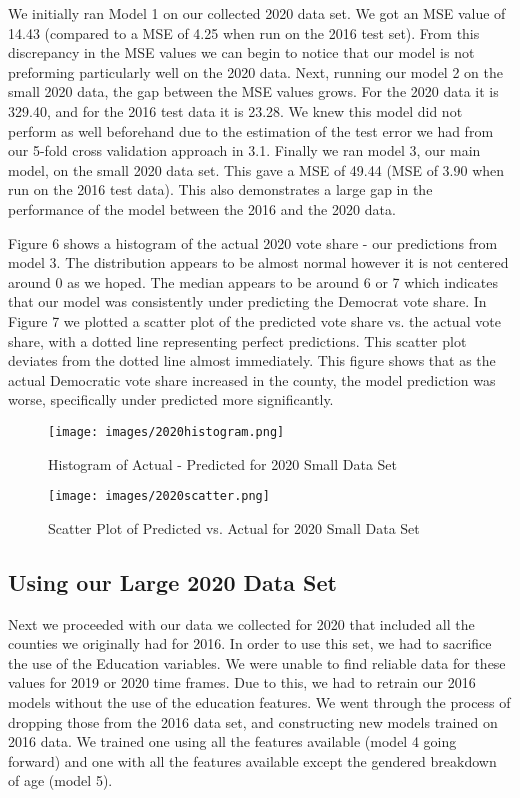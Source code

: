 \documentclass[letterpaper, twocolumn]{article}
\begin{document}
We initially ran Model 1 on our collected 2020 data set. We got an MSE value of 14.43 (compared to a MSE of 4.25 when run on the 2016 test set). From this discrepancy in the MSE values we can begin to notice that our model is not preforming particularly well on the 2020 data. Next, running our model 2 on the small 2020 data, the gap between the MSE values grows. For the 2020 data it is 329.40, and for the 2016 test data it is 23.28. We knew this model did not perform as well beforehand due to the estimation of the test error we had from our 5-fold cross validation approach in 3.1. Finally we ran model 3, our main model, on the small 2020 data set. This gave a MSE of 49.44 (MSE of 3.90 when run on the 2016 test data). This also demonstrates a large gap in the performance of the model between the 2016 and the 2020 data. 

Figure 6 shows a histogram of the actual 2020 vote share - our predictions from model 3. The distribution appears to be almost normal however it is not centered around 0 as we hoped. The median appears to be around 6 or 7 which indicates that our model was consistently under predicting the Democrat vote share. In Figure 7 we plotted a scatter plot of the predicted vote share vs. the actual vote share, with a dotted line representing perfect predictions. This scatter plot deviates from the dotted line almost immediately. This figure shows that as the actual Democratic vote share increased in the county, the model prediction was worse, specifically under predicted more significantly. 

\begin{figure}[h]
    \centering
    \texttt{[image: images/2020histogram.png]}
    \caption{\centering  Histogram of Actual - Predicted for 2020 Small Data Set}
    \label{fig:arstmade}
\end{figure}

\begin{figure}[h]
    \centering
    \texttt{[image: images/2020scatter.png]}
    \caption{\centering Scatter Plot of Predicted vs. Actual for 2020 Small Data Set}
    \label{fig:arstmade}
\end{figure}

\subsection{Using our Large 2020 Data Set}
Next we proceeded with our data we collected for 2020 that included all the counties we originally had for 2016. In order to use this set, we had to sacrifice the use of the Education variables. We were unable to find reliable data for these values for 2019 or 2020 time frames. Due to this, we had to retrain our 2016 models without the use of the education features. We went through the process of dropping those from the 2016 data set, and constructing new models trained on 2016 data. We trained one using all the features available (model 4 going forward) and one with all the features available except the gendered breakdown of age (model 5). 
\end{document}
